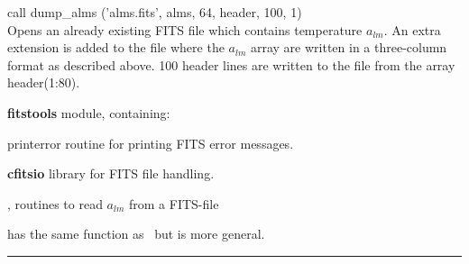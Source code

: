 \begin{example}
{
call dump\_alms ('alms.fits', alms, 64, header, 100, 1)  \\
}
{
Opens an already existing FITS file which contains temperature $a_{lm}$. An extra extension is added to the file where the $a_{lm}$ array are written in a three-column format as described above. 100 header lines are written to the file from the array header(1:80). 
}
\end{example}

\begin{modules}
  \begin{sulist}{} %
  \item[\textbf{fitstools}] module, containing:
  \item[printerror] routine for printing FITS error messages.
  \item[\textbf{cfitsio}] library for FITS file handling.		
  \end{sulist}
\end{modules}

\begin{related}
  \begin{sulist}{} %
  \item[\htmlref{fits2alms}{sub:fits2alms}, \htmlref{read\_conbintab}{sub:read_conbintab}] routines to read $a_{lm}$ from a FITS-file 
  \item[\htmlref{alms2fits}{sub:alms2fits}] has the same function as \thedocid\ but is more general.
  \end{sulist}
\end{related}

\rule{\hsize}{2mm}

\newpage
